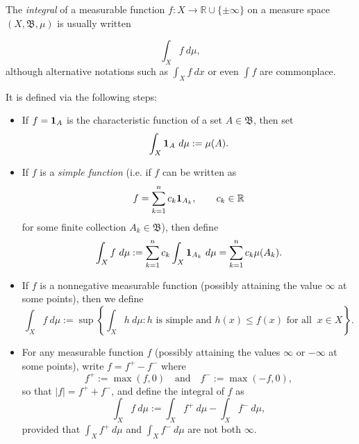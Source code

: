 \documentclass[12pt]{article}
\newcommand{\borel}{\mathfrak{B}}
\newcommand{\defined}{:=}
\newcommand{\1}{{{\bf 1}}}
\begin{document}
The \emph{integral} of a measurable function $f\colon X \to \mathbb{R} \cup \{\pm \infty\}$ on a measure space $(X, \borel, \mu)$ is usually written

\begin{equation}
\int_{X} f\ d\mu,
\end{equation}
although alternative notations such as $\int_X f\ dx$ or even $\int f$ are commonplace.

It is defined via the following steps:

\begin{itemize}
\item If $f = \1_A$ is the characteristic function of a set $A \in \borel$, then set
\begin{equation}
\int_{X} \1_A\ d\mu \defined \mu(A).
\end{equation}
\item
If $f$ is a \emph{simple function} (i.e. if $f$ can be written as
\begin{equation}
f = \sum_{k=1}^{n} c_k \1_{A_k}, \qquad c_k \in \mathbb{R}
\end{equation}
for some finite collection $A_k \in \mathfrak{B}$), then define
\begin{equation}
\int_{X} f\ d\mu \defined \sum_{k=1}^{n} c_k \int_{X} \1_{A_k}\ d\mu = \sum_{k=1}^{n} c_k \mu(A_k).
\end{equation}
\item
If $f$ is a nonnegative measurable function (possibly attaining the value $\infty$ at some points), then we define
\begin{equation}
\int_{X} f\ d\mu \defined \sup\left\{ \int_{X} h\ d\mu : h \text{ is simple and  } h(x) \le f(x) \text{ for all }\ x \in X \right\}.
\end{equation}
\item
For any measurable function $f$ (possibly attaining the values $\infty$ or $-\infty$ at some points), write $f = f^{+} - f^{-}$ where
\begin{equation}
f^{+} \defined \max(f, 0) \quad \text{and} \quad f^{-} \defined \max(-f, 0),
\end{equation}
so that $|f|=f^+ + f^-$, and define the integral of $f$ as
\begin{equation}
\int_{X} f\ d\mu \defined \int_{X} f^{+}\ d\mu - \int_{X} f^{-}\ d\mu,
\end{equation}
provided that $\int_{X} f^{+}\ d\mu$ and $\int_{X} f^{-}\ d\mu$ are not both $\infty$.
\end{itemize}
\end{document}
